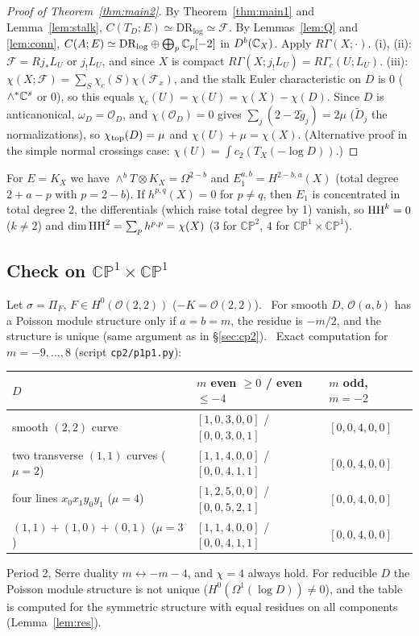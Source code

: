 \begin{proof}[Proof of Theorem~\ref{thm:main2}]
By Theorem~\ref{thm:main1} and Lemma~\ref{lem:stalk}, $C(T_D;E)\simeq\mathrm{DR}_{\log}\simeq\mathcal F$. By Lemmas~\ref{lem:Q} and \ref{lem:conn}, $C(A;E)\simeq\mathrm{DR}_{\log}\oplus\bigoplus_p\mathbb C_p[-2]$ in $D^b(\mathbb C_X)$. Apply $R\Gamma(X;\cdot)$.
(i), (ii): $\mathcal F=Rj_*L_U$ or $j_!L_U$, and since $X$ is compact $R\Gamma(X;j_!L_U)=R\Gamma_c(U;L_U)$.
(iii): $\chi(X;\mathcal F)=\sum_S\chi_c(S)\chi(\mathcal F_x)$, and the stalk Euler characteristic on $D$ is $0$ ($\wedge^*\mathbb C^s$ or $0$), so this equals $\chi_c(U)=\chi(U)=\chi(X)-\chi(D)$. Since $D$ is anticanonical, $\omega_D=\mathcal O_D$, and $\chi(\mathcal O_D)=0$ gives $\sum_j(2-2\tilde g_j)=2\mu$ ($\tilde D_j$ the normalizations), so $\chi_{\rm top}(D)=\mu$ and $\chi(U)+\mu=\chi(X)$. (Alternative proof in the simple normal crossings case: $\chi(U)=\int c_2(T_X(-\log D))$.)
\end{proof}
\begin{prop}[$r_i=1$: $E=K_X$]\tP\label{prop:K}
For $E=K_X$ we have $\wedge^bT\otimes K_X=\Omega^{2-b}$ and $E_1^{a,b}=H^{2-b,a}(X)$ (total degree $2+a-p$ with $p=2-b$). If $h^{p,q}(X)=0$ for $p\ne q$, then $E_1$ is concentrated in total degree $2$, the differentials (which raise total degree by 1) vanish, so $\mathrm{HH}^k=0$ ($k\ne2$) and $\dim\mathrm{HH}^2=\sum_ph^{p,p}=\chi(X)$ ($3$ for $\mathbb{CP}^2$, $4$ for $\mathbb{CP}^1\times\mathbb{CP}^1$).
\end{prop}

\subsection{Check on $\mathbb{CP}^1\times\mathbb{CP}^1$}
Let $\sigma=\Pi_F$, $F\in H^0(\mathcal O(2,2))$ ($-K=\mathcal O(2,2)$). \tP\ For smooth $D$, $\mathcal O(a,b)$ has a Poisson module structure only if $a=b=m$, the residue is $-m/2$, and the structure is unique (same argument as in \S\ref{sec:cp2}). \tV\ Exact computation for $m=-9,\dots,8$ (script \texttt{cp2/p1p1.py}):
\begin{center}\small
\begin{tabular}{lll}\toprule
$D$ & $m$ even $\ge0$ / even $\le-4$ & $m$ odd, $m=-2$\\\midrule
smooth $(2,2)$ curve & $[1,0,3,0,0]$ / $[0,0,3,0,1]$ & $[0,0,4,0,0]$\\
two transverse $(1,1)$ curves ($\mu=2$) & $[1,1,4,0,0]$ / $[0,0,4,1,1]$ & $[0,0,4,0,0]$\\
four lines $x_0x_1y_0y_1$ ($\mu=4$) & $[1,2,5,0,0]$ / $[0,0,5,2,1]$ & $[0,0,4,0,0]$\\
$(1,1)+(1,0)+(0,1)$ ($\mu=3$) & $[1,1,4,0,0]$ / $[0,0,4,1,1]$ & $[0,0,4,0,0]$\\\bottomrule
\end{tabular}
\end{center}
Period 2, Serre duality $m\leftrightarrow-m-4$, and $\chi=4$ always hold. For reducible $D$ the Poisson module structure is not unique ($H^0(\Omega^1(\log D))\ne0$), and the table is computed for the symmetric structure with equal residues on all components (Lemma~\ref{lem:res}).

